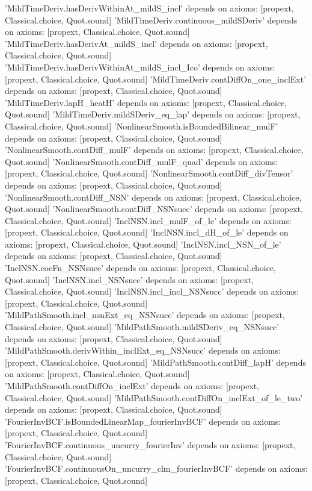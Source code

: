 \documentclass[11pt,a4paper]{article}
\theoremstyle{definition}
\theoremstyle{remark}
\begin{document}
\begin{leancode}
'MildTimeDeriv.hasDerivWithinAt_mildS_incl' depends on axioms: [propext, Classical.choice, Quot.sound]
'MildTimeDeriv.continuous_mildSDeriv' depends on axioms: [propext, Classical.choice, Quot.sound]
'MildTimeDeriv.hasDerivAt_mildS_incl' depends on axioms: [propext, Classical.choice, Quot.sound]
'MildTimeDeriv.hasDerivWithinAt_mildS_incl_Ico' depends on axioms: [propext, Classical.choice, Quot.sound]
'MildTimeDeriv.contDiffOn_one_inclExt' depends on axioms: [propext, Classical.choice, Quot.sound]
'MildTimeDeriv.lapH_heatH' depends on axioms: [propext, Classical.choice, Quot.sound]
'MildTimeDeriv.mildSDeriv_eq_lap' depends on axioms: [propext, Classical.choice, Quot.sound]
'NonlinearSmooth.isBoundedBilinear_mulF' depends on axioms: [propext, Classical.choice, Quot.sound]
'NonlinearSmooth.contDiff_mulF' depends on axioms: [propext, Classical.choice, Quot.sound]
'NonlinearSmooth.contDiff_mulF_quad' depends on axioms: [propext, Classical.choice, Quot.sound]
'NonlinearSmooth.contDiff_divTensor' depends on axioms: [propext, Classical.choice, Quot.sound]
'NonlinearSmooth.contDiff_NSN' depends on axioms: [propext, Classical.choice, Quot.sound]
'NonlinearSmooth.contDiff_NSNsucc' depends on axioms: [propext, Classical.choice, Quot.sound]
'InclNSN.incl_mulF_of_le' depends on axioms: [propext, Classical.choice, Quot.sound]
'InclNSN.incl_dH_of_le' depends on axioms: [propext, Classical.choice, Quot.sound]
'InclNSN.incl_NSN_of_le' depends on axioms: [propext, Classical.choice, Quot.sound]
'InclNSN.coeFn_NSNsucc' depends on axioms: [propext, Classical.choice, Quot.sound]
'InclNSN.incl_NSNsucc' depends on axioms: [propext, Classical.choice, Quot.sound]
'InclNSN.incl_incl_NSNsucc' depends on axioms: [propext, Classical.choice, Quot.sound]
'MildPathSmooth.incl_nsnExt_eq_NSNsucc' depends on axioms: [propext, Classical.choice, Quot.sound]
'MildPathSmooth.mildSDeriv_eq_NSNsucc' depends on axioms: [propext, Classical.choice, Quot.sound]
'MildPathSmooth.derivWithin_inclExt_eq_NSNsucc' depends on axioms: [propext, Classical.choice, Quot.sound]
'MildPathSmooth.contDiff_lapH' depends on axioms: [propext, Classical.choice, Quot.sound]
'MildPathSmooth.contDiffOn_inclExt' depends on axioms: [propext, Classical.choice, Quot.sound]
'MildPathSmooth.contDiffOn_inclExt_of_le_two' depends on axioms: [propext, Classical.choice, Quot.sound]
'FourierInvBCF.isBoundedLinearMap_fourierInvBCF' depends on axioms: [propext, Classical.choice, Quot.sound]
'FourierInvBCF.continuous_uncurry_fourierInv' depends on axioms: [propext, Classical.choice, Quot.sound]
'FourierInvBCF.continuousOn_uncurry_clm_fourierInvBCF' depends on axioms: [propext, Classical.choice, Quot.sound]

\end{leancode}
\end{document}
